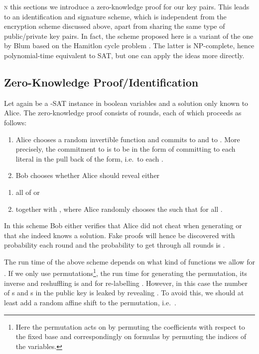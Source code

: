 \documentclass[final,journal,compsoc]{IEEEtran}
\begin{document}
\textsc{n} this sections we introduce a zero-knowledge proof for our key
pairs. This leads to an identification and signature scheme, which is
independent from the encryption scheme discussed above, apart from
sharing the same type of public/private key pairs. In fact, the scheme
proposed here is a variant of the one by Blum based on the Hamitlon
cycle problem \cite{Blum1986}. The latter is NP-complete, hence
polynomial-time equivalent to SAT, but one can apply the ideas more
directly.




\subsection{Zero-Knowledge Proof/Identification\label{sec:zero-knowl-proof}}

Let  again be a -SAT instance in  boolean
variables and  a solution only known to
Alice. The zero-knowledge proof consists of
 rounds, each of which proceeds as follows:
\begin{enumerate}
\item Alice chooses a random invertible function  and commits to  and to
  . More precisely, the commitment to  is to
  be in the form of committing to each literal in the pull back of the
  form, i.e.\ to each .

\item \label{item:14} Bob chooses whether Alice should reveal either
\end{enumerate}
\begin{enumerate}[label=2.\alph*)]
\item\label{item:15} all of  or
\item\label{item:16}  together with , where Alice randomly chooses the  such that
   for all . 
\end{enumerate}
In this scheme Bob either verifies that Alice did not cheat when
generating  or that she indeed knows a solution. Fake
proofs will hence be discovered with probability  each
round and the probability to get through all rounds is 
.


The run time of the above scheme depends on what kind of functions we
allow for . If we only use permutations\footnote{Here the
  permutation acts on  by permuting the coefficients with
  respect to the fixed base and correspondingly on formulas by
  permuting the indices of the variables.}, the run time for
generating the permutation, its inverse and reshuffling  is
 and  for re-labelling . However, in this case the
number of s and s in the public key is leaked by revealing
. 
To avoid this, we should at least add a random affine shift
 to the permutation, i.e.\ .
\end{document}
